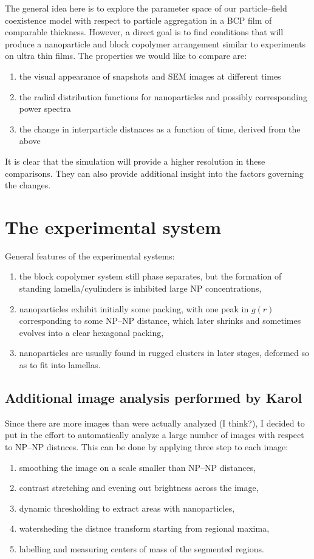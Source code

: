 The general idea here is to explore the parameter space of our particle--field coexistence model\cite{2008-Sevink-Fraaije} with respect to particle aggregation in a BCP film of comparable thickness. However, a direct goal is to find conditions that will produce a nanoparticle and block copolymer arrangement similar to experiments on ultra thin films. The properties we would like to compare are:
\begin{enumerate}
\item the visual appearance of snapshots and SEM images at different times
\item the radial distribution functions for nanoparticles and possibly corresponding power spectra
\item the change in interparticle distnaces as a function of time, derived from the above
\end{enumerate}

It is clear that the simulation will provide a higher resolution in these comparisons. They can also provide additional insight into the factors governing the changes.

\section{The experimental system}

General features of the experimental systems:
\begin{enumerate}
\item the block copolymer system still phase separates, but the formation of standing lamella/cyulinders is inhibited large NP concentrations,
\item nanoparticles exhibit initially some packing, with one peak in $g(r)$ corresponding to some NP--NP distance, which later shrinks and sometimes evolves into a clear hexagonal packing,
\item nanoparticles are usually found in rugged clusters in later stages, deformed so as to fit into lamellas.
\end{enumerate}

\subsection{Additional image analysis performed by Karol}

Since there are more images than were actually analyzed (I think?), I decided to put in the effort to automatically analyze a large number of images with respect to NP--NP distnces. This can be done by applying three step to each image:
\begin{enumerate}
\item smoothing the image on a scale smaller than NP--NP distances,
\item contrast stretching and evening out brightness across the image,
\item dynamic thresholding to extract areas with nanoparticles,
\item watersheding the distnce transform starting from regional maxima,
\item labelling and measuring centers of mass of the segmented regions.
\end{enumerate}

